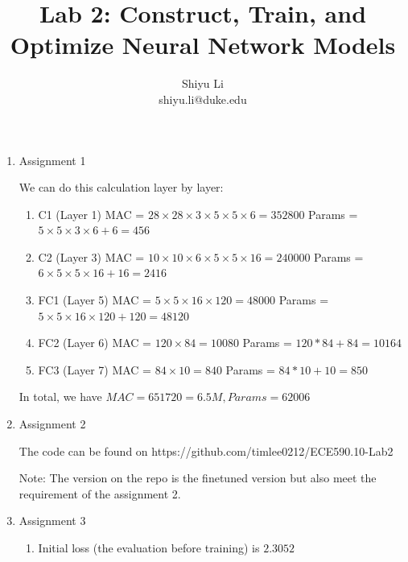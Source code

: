 \documentclass[11pt]{article}
\begin{document}
\author{Shiyu Li \\ shiyu.li@duke.edu}
\title{Lab 2: Construct, Train, and Optimize Neural Network Models}
\maketitle

\medskip

\begin{enumerate}

\item
Assignment 1

We can do this calculation layer by layer:

\begin{enumerate}
    \item C1 (Layer 1)
        MAC = $28\times 28 \times 3 \times 5 \times 5 \times 6 = 352800$ 
        Params = $5\times 5\times 3 \times 6 + 6  = 456$
    \item C2 (Layer 3)
        MAC = $10\times 10 \times 6 \times 5 \times 5 \times 16 = 240000$
        Params = $6\times 5 \times 5 \times 16 + 16 = 2416$
    \item FC1 (Layer 5)
        MAC = $5\times 5\times 16 \times 120 = 48000$
        Params = $5\times 5\times 16 \times 120 + 120 = 48120$
        
    \item FC2 (Layer 6)
        MAC = $120 \times 84 = 10080$
        Params = $120*84 + 84 = 10164$
        
    \item FC3 (Layer 7)
        MAC = $84 \times 10 = 840$
        Params = $84 * 10 + 10 = 850$
        
\end{enumerate}

In total, we have $MAC = 651720 = 6.5M, Params= 62006$

\item
Assignment 2

The code can be found on https://github.com/timlee0212/ECE590.10-Lab2

Note: The version on the repo is the finetuned version but also meet the requirement of the assignment 2.

\item
Assignment 3

\begin{enumerate}
    \item Initial loss (the evaluation before training) is $2.3052$
    

\end{enumerate}
\end{enumerate}
\end{document}
